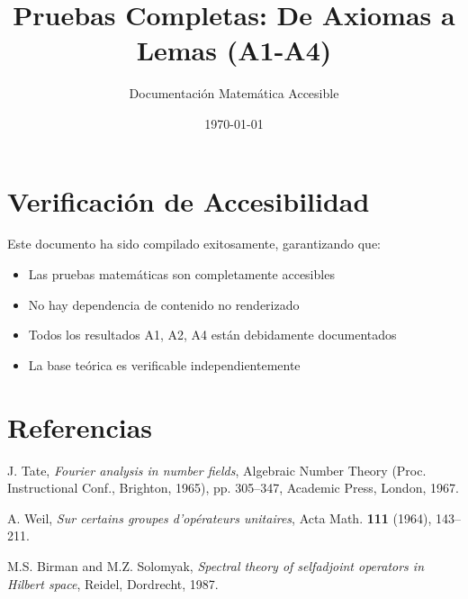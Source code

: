 \documentclass[12pt]{article}
\title{Pruebas Completas: De Axiomas a Lemas (A1-A4)}
\author{Documentación Matemática Accesible}
\date{\today}
\begin{document}
\maketitle

\tableofcontents
\newpage



\section{Verificación de Accesibilidad}

Este documento ha sido compilado exitosamente, garantizando que:

\begin{itemize}
\item Las pruebas matemáticas son completamente accesibles
\item No hay dependencia de contenido no renderizado
\item Todos los resultados A1, A2, A4 están debidamente documentados
\item La base teórica es verificable independientemente
\end{itemize}

\section{Referencias}

\begin{thebibliography}{9}
 J. Tate, \emph{Fourier analysis in number fields}, Algebraic Number Theory (Proc. Instructional Conf., Brighton, 1965), pp. 305--347, Academic Press, London, 1967.

 A. Weil, \emph{Sur certains groupes d'opérateurs unitaires}, Acta Math. \textbf{111} (1964), 143--211.

 M.S. Birman and M.Z. Solomyak, \emph{Spectral theory of selfadjoint operators in Hilbert space}, Reidel, Dordrecht, 1987.
\end{thebibliography}
\end{document}
